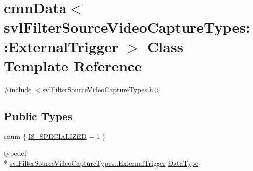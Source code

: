\hypertarget{classcmn_data_3_01svl_filter_source_video_capture_types_1_1_external_trigger_01_4}{\section{cmn\-Data$<$ svl\-Filter\-Source\-Video\-Capture\-Types\-:\-:External\-Trigger $>$ Class Template Reference}
\label{classcmn_data_3_01svl_filter_source_video_capture_types_1_1_external_trigger_01_4}
}


{\ttfamily \#include $<$svl\-Filter\-Source\-Video\-Capture\-Types.\-h$>$}

\subsection*{Public Types}
\begin{DoxyCompactItemize}
\item 
enum \{ \hyperlink{classcmn_data_3_01svl_filter_source_video_capture_types_1_1_external_trigger_01_4_a7b41d22e616ef5e06a38c2491ecccbdaadc3c140213120ad9726d550daf5993a7}{I\-S\-\_\-\-S\-P\-E\-C\-I\-A\-L\-I\-Z\-E\-D} = 1
 \}
\item 
typedef \\*
\hyperlink{classsvl_filter_source_video_capture_types_1_1_external_trigger}{svl\-Filter\-Source\-Video\-Capture\-Types\-::\-External\-Trigger} \hyperlink{classcmn_data_3_01svl_filter_source_video_capture_types_1_1_external_trigger_01_4_a40012c3eec7676d2b0252443ae621472}{Data\-Type}
\end{DoxyCompactItemize}
